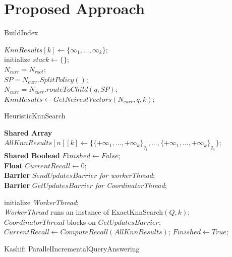 \section{Proposed Approach}
\label{sec:system-architecture}

\begin{algorithm}
	\DontPrintSemicolon
	\caption{{\sc BuildIndex}}
	\label{algo:build_index}
\end{algorithm}

\small
\begin{algorithm}
	\DontPrintSemicolon
	\vspace{.2cm}
	$KnnResults[k] \gets \{\infty_{1}, ..., \infty_{k}\}$;\\
	initialize $stack \gets \{\}$;\\
	$N_{curr} = N_{root}$;\\
	
	\vspace{.2cm}
	{
		$SP = N_{curr}.SplitPolicy()$;\\
		$N_{curr} = N_{curr}.routeToChild(q, SP)$;\\
		
	}
	$KnnResults \gets GetNeirestVectors(N_{curr}, q, k)$;\\
	\caption{{\sc HeuristicKnnSearch}}
	\label{algo:heuristic_knn_search}
\end{algorithm}


\small
\begin{algorithm}
	\DontPrintSemicolon %
	\vspace{.2cm}
	\textbf{Shared Array} $AllKnnResults[n][k] \gets \{\{+\infty_{1}, ..., +\infty_{k}\}_{q_{1}}, ..., \{+\infty_{1}, ..., +\infty_{k}\}_{q_{n}}\}$;\\
	\textbf{Shared Boolead} $Finished \gets False$;\\
	\textbf{Float} $CurrentRecall \gets 0$;\\
	\textbf{Barrier} $SendUpdatesBarrier$ {\it for workerThread};\\
	\textbf{Barrier} $GetUpdatesBarrier$ {\it for CoordinatorThread};\\
	
	\vspace{.2cm}
	
	
	initialize {\it WorkerThread};\\
	{\it WorkerThread} runs an instance of {\sc ExactKnnSearch$(Q, k)$};\\
	{ 
		$CoordinatorThread$ blocks on $GetUpdatesBarrier$;\\
		$CurrentRecall \gets ComputeRecall(AllKnnResults)$;
	}
	$Finished \gets True$;\\
	\caption{{\sc Kashif: ParallelIncrementalQueryAnswering}}
	\label{algo:query_answering}
\end{algorithm}


